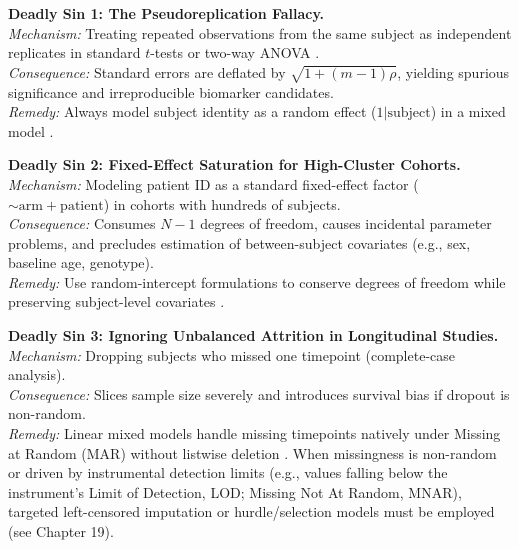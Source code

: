 \documentclass[11pt,twoside,openright]{book}
\begin{document}
\begin{pitfallbox}
\textbf{Deadly Sin 1: The Pseudoreplication Fallacy.}\\
\textit{Mechanism:} Treating repeated observations from the same subject as independent replicates in standard $t$-tests or two-way ANOVA \cite{hurlbert1984pseudoreplication}.\\
\textit{Consequence:} Standard errors are deflated by $\sqrt{1 + (m-1)\rho}$, yielding spurious significance and irreproducible biomarker candidates.\\
\textit{Remedy:} Always model subject identity as a random effect ($1 | \text{subject}$) in a mixed model \cite{pinheiro2000mixed}.
\end{pitfallbox}

\begin{pitfallbox}
\textbf{Deadly Sin 2: Fixed-Effect Saturation for High-Cluster Cohorts.}\\
\textit{Mechanism:} Modeling patient ID as a standard fixed-effect factor ($\sim \text{arm} + \text{patient}$) in cohorts with hundreds of subjects.\\
\textit{Consequence:} Consumes $N - 1$ degrees of freedom, causes incidental parameter problems, and precludes estimation of between-subject covariates (e.g., sex, baseline age, genotype).\\
\textit{Remedy:} Use random-intercept formulations to conserve degrees of freedom while preserving subject-level covariates \cite{laird1982random}.
\end{pitfallbox}

\begin{pitfallbox}
\textbf{Deadly Sin 3: Ignoring Unbalanced Attrition in Longitudinal Studies.}\\
\textit{Mechanism:} Dropping subjects who missed one timepoint (complete-case analysis).\\
\textit{Consequence:} Slices sample size severely and introduces survival bias if dropout is non-random.\\
\textit{Remedy:} Linear mixed models handle missing timepoints natively under Missing at Random (MAR) without listwise deletion \cite{fitzmaurice2012applied}. When missingness is non-random or driven by instrumental detection limits (e.g., values falling below the instrument's Limit of Detection, LOD; Missing Not At Random, MNAR), targeted left-censored imputation or hurdle/selection models must be employed (see Chapter 19).
\end{pitfallbox}
\end{document}
